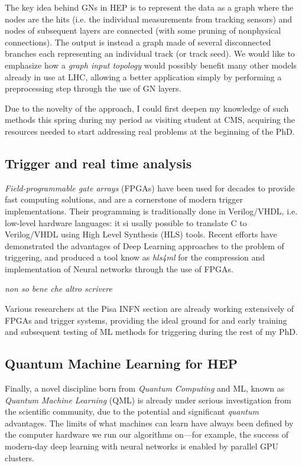 \documentclass{scrartcl} %
\begin{document}
The key idea behind GNs in HEP is to represent the data as a graph where the nodes are the hits (i.e. the individual measurements from tracking sensors) and nodes of subsequent
layers are connected (with some pruning of nonphysical connections). The output is instead a graph made of several disconnected branches each representing an
individual track (or track seed). We would like to emphasize how a \emph{graph input topology} would possibly benefit many other models already in use at LHC, allowing a better application simply by performing a preprocessing step through the use of GN layers.

Due to the novelty of the approach, I could first deepen my knowledge of such methods this spring during my period as visiting student at CMS, acquiring the resources needed to start addressing real problems at the beginning of the PhD.

\subsection*{Trigger and real time analysis}

\emph{Field-programmable gate arrays} (FPGAs) have been used for
decades to provide fast computing solutions, and are a cornerstone of modern trigger implementations. Their programming is  traditionally done in Verilog/VHDL, i.e. low-level hardware languages: it si usally possible to translate C to Verilog/VHDL using High Level Synthesis (HLS) tools. Recent efforts have demonstrated the advantages of Deep Learning approaches to the problem of triggering, and produced a tool know as \emph{hls4ml} \cite{trg2018} for the compression and implementation of Neural networks through the use of FPGAs.

\emph{non so bene che altro scrivere}

Various researchers at the Pisa INFN section are already working extensively of FPGAs and trigger systems, providing the ideal ground for and early training and subsequent testing of ML methods for triggering during the rest of my PhD.

\subsection*{Quantum Machine Learning for HEP}

Finally, a novel discipline born from \emph{Quantum Computing} and ML, known as \emph{Quantum Machine Learning} (QML) is already under serious investigation from the scientific community, due to the potential and significant \emph{quantum} advantages. The limits of what machines can learn have always been defined by the computer hardware we run our algorithms on—for example, the success of modern-day deep learning with neural networks is enabled by parallel GPU clusters.
\end{document}
